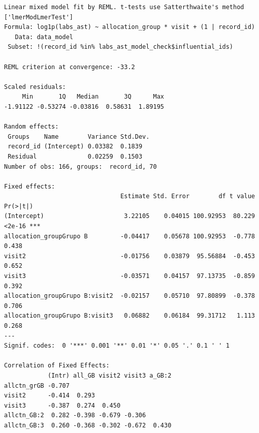 \documentclass[
  12pt,
]{article}
\newenvironment{Shaded}{\begin{snugshade}}{\end{snugshade}}
\newcommand{\NormalTok}[1]{\textcolor[rgb]{0.00,0.23,0.31}{#1}}
\newcommand{\SpecialCharTok}[1]{\textcolor[rgb]{0.37,0.37,0.37}{#1}}
\begin{document}
\begin{verbatim}
Linear mixed model fit by REML. t-tests use Satterthwaite's method ['lmerModLmerTest']
Formula: log1p(labs_ast) ~ allocation_group * visit + (1 | record_id)
   Data: data_model
 Subset: !(record_id %in% labs_ast_model_check$influential_ids)

REML criterion at convergence: -33.2

Scaled residuals: 
     Min       1Q   Median       3Q      Max 
-1.91122 -0.53274 -0.03816  0.58631  1.89195 

Random effects:
 Groups    Name        Variance Std.Dev.
 record_id (Intercept) 0.03382  0.1839  
 Residual              0.02259  0.1503  
Number of obs: 166, groups:  record_id, 70

Fixed effects:
                                Estimate Std. Error        df t value Pr(>|t|)    
(Intercept)                      3.22105    0.04015 100.92953  80.229   <2e-16 ***
allocation_groupGrupo B         -0.04417    0.05678 100.92953  -0.778    0.438    
visit2                          -0.01756    0.03879  95.56884  -0.453    0.652    
visit3                          -0.03571    0.04157  97.13735  -0.859    0.392    
allocation_groupGrupo B:visit2  -0.02157    0.05710  97.80899  -0.378    0.706    
allocation_groupGrupo B:visit3   0.06882    0.06184  99.31712   1.113    0.268    
---
Signif. codes:  0 '***' 0.001 '**' 0.01 '*' 0.05 '.' 0.1 ' ' 1

Correlation of Fixed Effects:
            (Intr) all_GB visit2 visit3 a_GB:2
allctn_grGB -0.707                            
visit2      -0.414  0.293                     
visit3      -0.387  0.274  0.450              
allctn_GB:2  0.282 -0.398 -0.679 -0.306       
allctn_GB:3  0.260 -0.368 -0.302 -0.672  0.430
\end{verbatim}

\begin{Shaded}
\end{Shaded}
\end{document}
